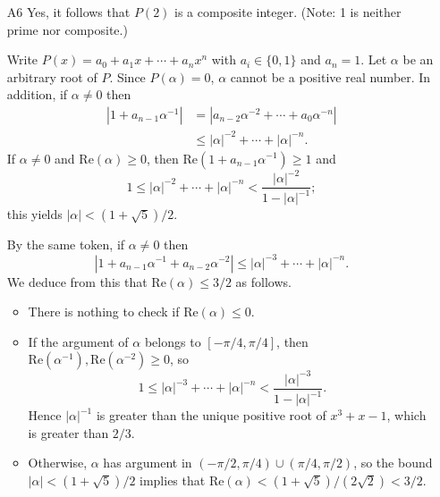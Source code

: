 \documentclass[amssymb,twocolumn,pra,10pt,aps]{revtex4-1}
\begin{document}
\begin{itemize}
\item[A6]
Yes, it follows that $P(2)$ is a composite integer. (Note: 1 is neither prime nor composite.)

Write $P(x) = a_0 + a_1 x + \cdots + a_n x^n$ with $a_i \in \{0,1\}$ and $a_n = 1$.
Let $\alpha$ be an arbitrary root of $P$. Since $P(\alpha) = 0$, $\alpha$ cannot be a positive real number.
%
In addition, if $\alpha \neq 0$ then
\begin{align*}
|1 + a_{n-1} \alpha^{-1}| &= |a_{n-2} \alpha^{-2} + \cdots + a_0 \alpha^{-n}| \\
&\leq |\alpha|^{-2} + \cdots + |\alpha|^{-n}.
\end{align*}
If $\alpha \neq 0$ and $\mathrm{Re}(\alpha) \geq 0$, then $\mathrm{Re}(1 + a_{n-1} \alpha^{-1}) \geq 1$
and 
\[
1 \leq |\alpha|^{-2} + \cdots + |\alpha|^{-n} < \frac{|\alpha|^{-2}}{1 - |\alpha|^{-1}};
\]
this yields $|\alpha| < (1 + \sqrt{5})/2$.

By the same token, if $\alpha \neq 0$ then
\[
|1 + a_{n-1} \alpha^{-1} + a_{n-2} \alpha^{-2}| \leq |\alpha|^{-3} + \cdots + |\alpha|^{-n}.
\]
We deduce from this that $\mathrm{Re}(\alpha) \leq 3/2$ as follows.
\begin{itemize}
\item
There is nothing to check if $\mathrm{Re}(\alpha) \leq 0$.
\item
If the argument of $\alpha$ belongs to $[-\pi/4, \pi/4]$, then $\mathrm{Re}(\alpha^{-1}), \mathrm{Re}(\alpha^{-2}) \geq 0$, so
\[
1 \leq |\alpha|^{-3} + \cdots + |\alpha|^{-n} < \frac{|\alpha|^{-3}}{1 - |\alpha|^{-1}}.
\]
Hence $|\alpha|^{-1}$ is greater than the unique positive root of $x^3 + x - 1$, which 
is greater than $2/3$. 
\item
Otherwise, $\alpha$ has argument in $(-\pi/2,\pi/4) \cup (\pi/4,\pi/2)$,
so the bound $|\alpha| < (1 + \sqrt{5})/2$ implies that $\mathrm{Re}(\alpha) < (1 + \sqrt{5})/(2 \sqrt{2}) < 3/2$.
\end{itemize}


\end{itemize}
\end{document}

